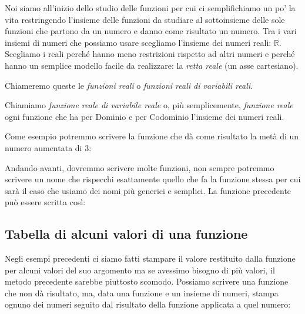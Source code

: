 Noi siamo all'inizio dello studio delle funzioni per cui ci 
semplifichiamo un po' la vita restringendo l'insieme delle funzioni da 
studiare al sottoinsieme delle sole funzioni che partono da un numero e 
danno come risultato un numero. 
Tra i vari insiemi di numeri che possiamo usare scegliamo l'insieme dei 
numeri reali: $\mathbb{R}$. Scegliamo i reali perché hanno meno restrizioni 
rispetto ad altri numeri e perché hanno un semplice modello facile da 
realizzare: 
la \emph{retta reale} (un asse cartesiano).

Chiameremo queste le \emph{funzioni reali} o 
\emph{funzioni reali di variabili reali}.

\begin{definizione}
Chiamiamo \emph{funzione reale di variabile reale} o, più 
semplicemente, \emph{funzione reale} ogni funzione che ha per Dominio e 
per Codominio l'insieme dei numeri reali.
\end{definizione}

\begin{esempio}
Come esempio potremmo scrivere la funzione che dà come risultato la metà di 
un numero aumentata di 3:


\end{esempio}

Andando avanti, dovremmo scrivere molte funzioni, non sempre potremmo 
scrivere un nome che rispecchi esattamente quello che fa la funzione stessa 
per cui sarà il caso che usiamo dei nomi più generici e semplici. 
La funzione precedente può essere scritta così:


\subsection{Tabella di alcuni valori di una funzione}

Negli esempi precedenti ci siamo fatti stampare il valore restituito dalla 
funzione per alcuni valori del suo argomento ma se avessimo bisogno di più 
valori, il metodo precedente sarebbe piuttosto scomodo. Possiamo scrivere 
una funzione che non dà risultato, ma, data una funzione e un insieme di 
numeri, stampa ognuno dei numeri seguito dal risultato della funzione 
applicata a quel numero:


